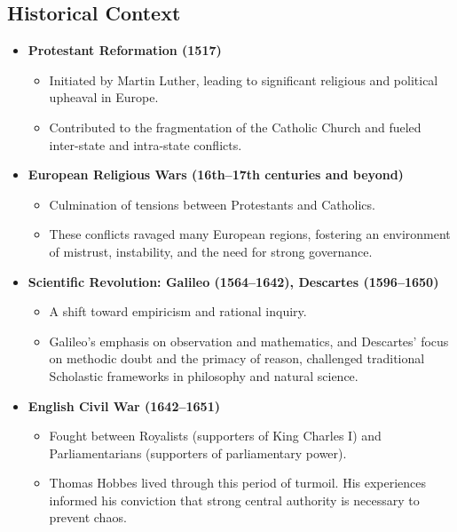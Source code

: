 \subsection*{Historical Context}

        \begin{itemize}
            \item \textbf{Protestant Reformation (1517)}
            \begin{itemize}
                \item Initiated by Martin Luther, leading to significant religious and political upheaval in Europe.
                \item Contributed to the fragmentation of the Catholic Church and fueled inter-state and intra-state conflicts.
            \end{itemize}
        
            \item \textbf{European Religious Wars (16th--17th centuries and beyond)}
            \begin{itemize}
                \item Culmination of tensions between Protestants and Catholics.
                \item These conflicts ravaged many European regions, fostering an environment of mistrust, instability, and the need for strong governance.
            \end{itemize}
        
            \item \textbf{Scientific Revolution: Galileo (1564--1642), Descartes (1596--1650)}
            \begin{itemize}
                \item A shift toward empiricism and rational inquiry.
                \item Galileo’s emphasis on observation and mathematics, and Descartes’ focus on methodic doubt and the primacy of reason, challenged traditional Scholastic frameworks in philosophy and natural science.
            \end{itemize}
        
            \item \textbf{English Civil War (1642--1651)}
            \begin{itemize}
                \item Fought between Royalists (supporters of King Charles I) and Parliamentarians (supporters of parliamentary power).
                \item Thomas Hobbes lived through this period of turmoil. His experiences informed his conviction that strong central authority is necessary to prevent chaos.
            \end{itemize}
        \end{itemize}
        
